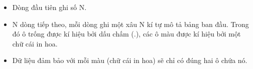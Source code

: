 \begin{itemize}
	\item Dòng đầu tiên ghi số N.
	\item N dòng tiếp theo, mỗi dòng ghi một xâu N kí tự mô tả bảng ban đầu. Trong đó ô trống được kí hiệu bởi dấu chấm (.), các ô màu được kí hiệu bởi một chữ cái in hoa. 
	\item Dữ liệu đảm bảo với mỗi màu (chữ cái in hoa) sẽ chỉ có đúng hai ô chứa nó.
\end{itemize}